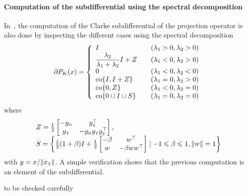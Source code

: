 \paragraph{Computation of the subdifferential using the spectral decomposition}


In~\cite{Hayashi.ea_SIOPT2005}, the computation of the Clarke subdifferential of the projection operator is also done by inspecting the different cases using the spectral decomposition
\begin{equation}
  \label{eq:Jordan-projection-Jacobian}
  \partial P_K(x) =
  \left\{
    \begin{array}{ll}
      I & \quad (\lambda_1>0, \lambda_2 >0 ) \\
      \Frac{\lambda_2}{\lambda_1+\lambda_2} I +Z & \quad (\lambda_1< 0, \lambda_2 >0 ) \\
      0 & \quad (\lambda_1< 0, \lambda_2 <0 ) \\
      \co\{I, I+Z\} & \quad (\lambda_1=0, \lambda_2 >0 ) \\
      \co\{0, Z\} & \quad (\lambda_1<0, \lambda_2 =0 ) \\
      \co\{0 \cup  I \cup S\}  & \quad (\lambda_1=0, \lambda_2 =0 )
    \end{array}
  \right.
\end{equation}
where
\begin{equation}
  \label{eq:Jordan-projection-Jacobian2}
  \begin{array}{l}
  Z  = \frac 1 2
  \begin{bmatrix}
    - y_\n & y_\t^\top\\
    y_\t & - y_\n y_\t y_\t^\top
  \end{bmatrix},\\
  S = \left\{\frac 1 2 (1+\beta) I + \frac 1 2
    \begin{bmatrix}
      -\beta & w^\top \\
      w & -\beta w w^\top
    \end{bmatrix}\mid -1 \leq \beta \leq 1, \|w\|=1\right\}
\end{array}
\end{equation}
with $y = x / \|x_{\hbox{\tiny{T}}}\|$. A simple verification shows that the previous computation is an element of the subdifferential.



\begin{ndrva}
  to be checked carefully
\end{ndrva}





